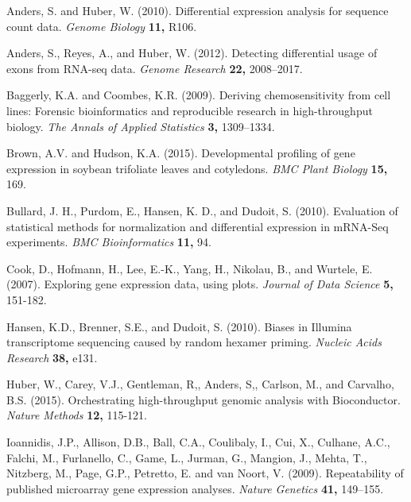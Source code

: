 \documentclass[referee]{biom}
\begin{document}
%
%   
% 

\begin{thebibliography}{}

\bibitem{ } Anders, S. and Huber, W. (2010). Differential expression analysis for sequence count data. \textit{Genome Biology} \textbf{11,} R106.

\bibitem{ } Anders, S., Reyes, A., and Huber, W. (2012). Detecting differential usage of exons from RNA-seq data. \textit{Genome Research} \textbf{22,} 2008–2017.

\bibitem{ } Baggerly, K.A. and Coombes, K.R. (2009). Deriving chemosensitivity from cell lines: Forensic bioinformatics and reproducible research in high-throughput biology. \textit{The Annals of Applied Statistics} \textbf{3,} 1309–1334.

\bibitem{ } Brown, A.V. and Hudson, K.A. (2015). Developmental profiling of gene expression in soybean trifoliate leaves and cotyledons. \textit{BMC Plant Biology} \textbf{15,} 169.

\bibitem{ } Bullard, J. H., Purdom, E., Hansen, K. D., and Dudoit, S. (2010). Evaluation of statistical methods for normalization and differential expression in mRNA-Seq experiments. \textit{BMC Bioinformatics} \textbf{11,} 94.

\bibitem{ } Cook, D., Hofmann, H., Lee, E.-K., Yang, H., Nikolau, B., and Wurtele, E. (2007). Exploring gene expression data, using plots. \textit{Journal of Data Science} \textbf{5,} 151-182.

\bibitem{ } Hansen, K.D., Brenner, S.E., and Dudoit, S. (2010). Biases in Illumina transcriptome sequencing caused by random hexamer priming. \textit{Nucleic Acids Research} \textbf{38,} e131.

\bibitem{ } Huber, W., Carey, V.J., Gentleman, R,, Anders, S,, Carlson, M., and Carvalho, B.S. (2015). Orchestrating high-throughput genomic analysis with Bioconductor. \textit{Nature Methods} \textbf{12,} 115-121.

\bibitem{ } Ioannidis, J.P., Allison, D.B., Ball, C.A., Coulibaly, I., Cui, X., Culhane, A.C., Falchi, M., Furlanello, C., Game, L., Jurman, G., Mangion, J., Mehta, T., Nitzberg, M., Page, G.P., Petretto, E. and van Noort, V. (2009). Repeatability of published microarray gene expression analyses. \textit{Nature Genetics} \textbf{41,} 149–155.


\end{thebibliography}
\end{document}
